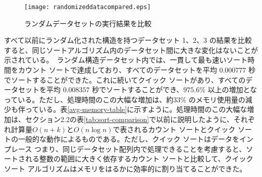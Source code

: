 \documentclass[a4j, 12pt]{jarticle}
\begin{document}
\begin{figure}[H]
  \centering
  \caption{ランダムデータセットの実行結果を比較}\label{combined-dataset-table-graph}
  \texttt{[image: randomizeddatacompared.eps]}
\end{figure}
すべて以前にランダム化された構造を持つデータセット 1、2、3 の結果を比較すると、同じソートアルゴリズム内のデータセット間に大きな変化はないことが示されている。\
ランダム構造データセット内では、一貫して最も速いソート時間をカウント ソートで達成しており、すべてのデータセットを平均 $0.000777$ 秒でソートすることができた。これに続いてクイック ソートがあり、すべてのデータセットを平均 $0.008357$ 秒でソートすることができ、$975.6\%$ 以上の増加となっている。ただし、処理時間のこの大幅な増加は、約$33\%$ のメモリ使用量の減少も伴っている。表\ref{avg-memory-table}に示すように。処理時間のこの大幅な増加は、セクション2.2の表\ref{tab:sort-comparison}で以前に説明したように、それぞれ計算量$O(n + k)$と$O(n \log n)$で表されるカウント ソートとクイック ソートの一般的な動作によるものである。ただし、クイック ソートはデータをインプレース \(つまり、同じデータセット配列内 \)で処理できることを考慮すると、ソートされる整数の範囲に大きく依存するカウント ソートと比較して、クイック ソート アルゴリズムはメモリをはるかに効率的に割り当てることができた。\
\begin{table}[H]
  \centering
  \caption{各データセットにおけるソート手法別のメモリ使用量（KB）および平均使用量（データ長：100000）}\label{avg-memory-table}
\end{table}
\end{document}
